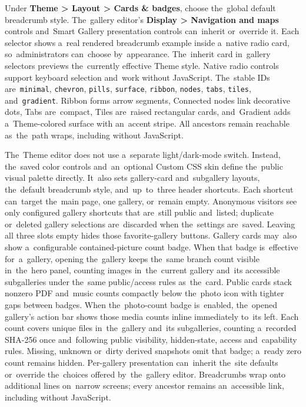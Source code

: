 \documentclass[11pt,a4paper]{article}
\newcommand{\ui}[1]{\textbf{#1}}
\newcommand{\codeword}[1]{\nolinkurl{#1}}
\begin{document}
Under \ui{Theme > Layout > Cards \& badges}, choose the~global default
breadcrumb style. The~gallery editor's \ui{Display > Navigation and maps}
controls and~Smart Gallery presentation controls can~inherit or~override it.
Each selector shows a~real rendered breadcrumb example inside a~native radio
card, so~administrators can~choose by~appearance. The~inherit card in~gallery
selectors previews the~currently effective Theme style. Native radio controls
support keyboard selection and~work without JavaScript. The~stable IDs
are~\codeword{minimal}, \codeword{chevron}, \codeword{pills},
\codeword{surface}, \codeword{ribbon}, \codeword{nodes}, \codeword{tabs},
\codeword{tiles}, and~\codeword{gradient}. Ribbon forms arrow segments,
Connected nodes link decorative dots, Tabs are~compact, Tiles are~raised
rectangular cards, and~Gradient adds a~Theme-colored surface with an~accent
stripe. All ancestors remain reachable as~the~path wraps, including without
JavaScript.

The~Theme editor does not use a~separate light/dark-mode switch. Instead,
the~saved color controls and~an~optional Custom CSS skin define the~public
visual palette directly. It~also sets gallery-card and~subgallery layouts,
the~default breadcrumb style, and~up~to~three header shortcuts. Each shortcut
can~target the~main page, one gallery, or~remain empty. Anonymous visitors see
only configured gallery shortcuts that are~still public and~listed; duplicate
or~deleted gallery selections are~discarded when the~settings are~saved. Leaving
all three slots empty hides those favorite-gallery buttons. Gallery cards
may~also show a~configurable contained-picture count badge. When that badge
is~effective for~a~gallery, opening the~gallery keeps the~same branch count
visible in~the~hero panel, counting images in~the~current gallery and~its
accessible subgalleries under the~same public/access rules as~the~card. Public
cards stack nonzero PDF and~music counts compactly below the~photo icon with
tighter gaps between badges. When the~photo-count badge is~enabled, the~opened
gallery's action bar shows those media counts inline immediately to~its left.
Each count covers unique files in~the~gallery and~its subgalleries, counting
a~recorded SHA-256 once and~following public visibility, hidden-state, access
and~capability rules. Missing, unknown or~dirty derived snapshots omit that
badge; a~ready zero count remains hidden. Per-gallery presentation can~inherit
the~site defaults or~override the~choices offered by~the~gallery editor.
Breadcrumbs wrap onto additional lines on~narrow screens; every ancestor remains
an~accessible link, including without JavaScript.
\end{document}
